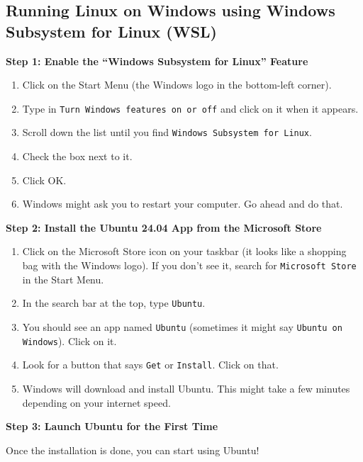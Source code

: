 \documentclass{article}
\begin{document}
\subsection{Running Linux on Windows using Windows Subsystem for Linux (WSL)}

\textbf{Step 1: Enable the ``Windows Subsystem for Linux'' Feature}

\begin{enumerate}[leftmargin=2em]
    \item Click on the Start Menu (the Windows logo in the bottom-left corner).
    \item Type in \texttt{Turn Windows features on or off} and click on it when it appears.
    \item Scroll down the list until you find \texttt{Windows Subsystem for Linux}.
    \item Check the box next to it.
    \item Click OK.
    \item Windows might ask you to restart your computer. Go ahead and do that.
\end{enumerate}

\textbf{Step 2: Install the Ubuntu 24.04 App from the Microsoft Store}


\begin{enumerate}[leftmargin=2em, resume]
    \item Click on the Microsoft Store icon on your taskbar (it looks like a shopping bag with the Windows logo). If you don't see it, search for \texttt{Microsoft Store} in the Start Menu.
    \item In the search bar at the top, type \texttt{Ubuntu}.
    \item You should see an app named \texttt{Ubuntu} (sometimes it might say \texttt{Ubuntu on Windows}). Click on it.
    \item Look for a button that says \texttt{Get} or \texttt{Install}. Click on that.
    \item Windows will download and install Ubuntu. This might take a few minutes depending on your internet speed.
\end{enumerate}

\textbf{Step 3: Launch Ubuntu for the First Time}

Once the installation is done, you can start using Ubuntu!
\end{document}
